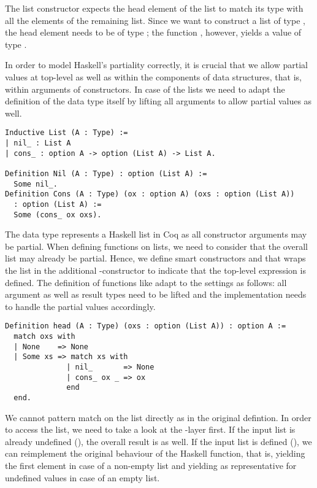 The list constructor  expects the head element
of the list to match its type with all the elements of the remaining
list.
Since we want to construct a list of type ,
the head element needs to be of type ;
the function , however, yields a value of type
.

In order to model Haskell's partiality correctly, it is crucial that
we allow partial values at top-level as well as within the components
of data structures, that is, within arguments of constructors.
In case of the lists we need to adapt the definition of the data type
itself by lifting all arguments to allow partial values as well.

\begin{verbatim}
Inductive List (A : Type) :=
| nil_ : List A
| cons_ : option A -> option (List A) -> List A.

Definition Nil (A : Type) : option (List A) :=
  Some nil_.
Definition Cons (A : Type) (ox : option A) (oxs : option (List A)) 
  : option (List A) :=
  Some (cons_ ox oxs).
\end{verbatim}

The data type  represents a Haskell list in Coq
as all constructor arguments may be partial.
When defining functions on lists, we need to consider that the overall
list may already be partial.
Hence, we define smart constructors  and
 that wraps the list in the additional
-constructor to indicate that the top-level
expression is defined.
The definition of  functions like  adapt to the settings as
follows: all argument as well as result types need to be lifted and
the implementation needs to handle the partial values accordingly.

\begin{verbatim}
Definition head (A : Type) (oxs : option (List A)) : option A :=
  match oxs with
  | None    => None
  | Some xs => match xs with
              | nil_       => None
              | cons_ ox _ => ox
              end
  end.
\end{verbatim}

We cannot pattern match on the list directly as in the original
defintion.
In order to access the list, we need to take a look at the
-layer first.
If the input list is already undefined (), the
overall result is  as well.
If the input list is defined (), we can
reimplement the original behaviour of the Haskell function, that is, yielding
the first element in case of a non-empty list and yielding
 as representative for undefined values in case
of an empty list.

